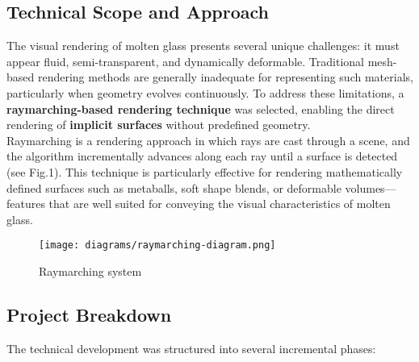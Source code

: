\documentclass{rapportcs}
\begin{document}
    \subsection{Technical Scope and Approach}
    
        The visual rendering of molten glass presents several unique challenges: it must appear fluid, semi-transparent, and dynamically deformable. Traditional mesh-based rendering methods are generally inadequate for representing such materials, particularly when geometry evolves continuously. To address these limitations, a \textbf{raymarching-based rendering technique} was selected, enabling the direct rendering of \textbf{implicit surfaces} without predefined geometry. \\
        
        Raymarching is a rendering approach in which rays are cast through a scene, and the algorithm incrementally advances along each ray until a surface is detected (see Fig.1). This technique is particularly effective for rendering mathematically defined surfaces such as metaballs, soft shape blends, or deformable volumes—features that are well suited for conveying the visual characteristics of molten glass.
    
        \begin{figure}[H]
            \centering
            \texttt{[image: diagrams/raymarching-diagram.png]}
            \caption{Raymarching system}
            \label{fig:label_image}
        \end{figure}
    
    \newpage
    
    \subsection{Project Breakdown}
        
        The technical development was structured into several incremental phases:
\end{document}
